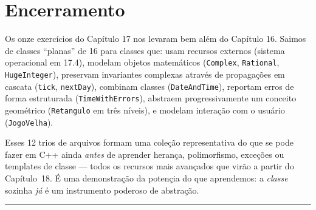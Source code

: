 \documentclass[11pt,a4paper]{article}
\begin{document}
\section*{Encerramento}

Os onze exerc\'icios do Cap\'itulo 17 nos levaram bem al\'em do Cap\'itulo 16. Saimos de classes ``planas'' de 16 para classes que: usam recursos externos (sistema operacional em 17.4), modelam objetos matem\'aticos (\texttt{Complex}, \texttt{Rational}, \texttt{HugeInteger}), preservam invariantes complexas atrav\'es de propaga\c{c}\~oes em cascata (\texttt{tick}, \texttt{nextDay}), combinam classes (\texttt{DateAndTime}), reportam erros de forma estruturada (\texttt{TimeWithErrors}), abstraem progressivamente um conceito geom\'etrico (\texttt{Retangulo} em tr\^es n\'iveis), e modelam intera\c{c}\~ao com o usu\'ario (\texttt{JogoVelha}).

Esses 12 trios de arquivos formam uma cole\c{c}\~ao representativa do que se pode fazer em C++ ainda \emph{antes} de aprender heran\c{c}a, polimorfismo, exce\c{c}\~oes ou templates de classe --- todos os recursos mais avan\c{c}ados que vir\~ao a partir do Cap\'itulo~18. \'E uma demonstra\c{c}\~ao da poten\c{c}ia do que aprendemos: a \emph{classe} sozinha \emph{j\'a} \'e um instrumento poderoso de abstra\c{c}\~ao.

\vspace{1em}
\begin{center}\rule{0.5\textwidth}{0.4pt}\end{center}
\end{document}
